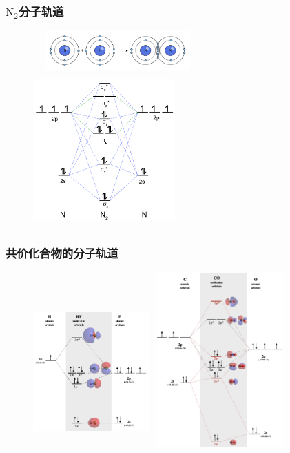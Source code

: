 \frame
{
	\frametitle{$\mathrm{N}_2$分子轨道}
\begin{figure}[h!]
\centering
\vspace{-10.5pt}
\includegraphics[height=0.60in,width=2.55in,viewport=0 0 500 130,clip]{Figures/Octet-Rule-N2.png}
\includegraphics[height=2.30in,width=2.15in,viewport=0 0 160 150,clip]{Figures/MO-N2.png}
\label{MO:N2}
\end{figure}
}

\frame
{
	\frametitle{共价化合物的分子轨道}
\begin{figure}[h!]
\centering
\vspace{-5.5pt}
\includegraphics[height=2.30in,width=1.75in,viewport=0 0 400 460,clip]{Figures/Molecular-orbital-diagram-of-HF.png}
\includegraphics[height=2.65in,width=2.05in,viewport=0 0 560 750,clip]{Figures/Molecular-orbital-diagram-of-CO.png}
\label{MO:HF}
\end{figure}
}

